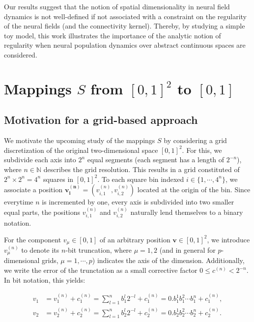 \documentclass[10pt,letterpaper]{article}
\renewcommand{\vec}[1]{\boldsymbol{#1}}
\begin{document}



Our results suggest that the notion of spatial dimensionality in neural field dynamics is not well-defined if not associated with a constraint on the regularity of the neural fields (and the connectivity kernel). Thereby, by studying a simple toy model, this work illustrates the importance of the analytic notion of regularity when neural population dynamics over abstract continuous spaces are considered. 

\section{Mappings $S$ from $[0,1]^2$ to $[0,1]$}

\subsection{Motivation for a grid-based approach}

We motivate the upcoming study of the mappings $S$ by considering a grid discretization of the original two-dimensional space $[0,1]^2$. For this, we subdivide each axis into $2^n$ equal segments (each segment has a length of $2^{-n}$), where $n \in \mathbb{N}$ describes the grid resolution. This results in a grid constituted of $2^n \times 2^n = 4^n$ squares in $[0,1]^2$. To each square bin indexed $i \in \{1,\cdots,4^n\}$, we associate a position $\vec{v_i^{(n)}} = (v_{i,1}^{(n)}, v_{i,2}^{(n)})$ located at the origin of the bin. Since everytime $n$ is incremented by one, every axis is subdivided into two smaller equal parts, the positions $v_{i,1}^{(n)}$ and $v_{i,2}^{(n)}$ naturally lend themselves to a binary notation.

For the component $v_\mu \in [0,1]$ of an arbitrary position $\vec{v} \in [0,1]^2$, we introduce $v_\mu^{(n)}$ to denote its $n$-bit truncation, where $\mu = 1,2$ (and in general for $p$-dimensional grids, $\mu=1, \cdots, p$) indicates the axis of the dimension. Additionally, we write the error of the trunctation as a small corrective factor $0 \leq c^{(n)} < 2^{-n}$. In bit notation, this yields: 

\begin{equation} \begin{aligned} \label{eq:positions-v}
v_1 &= v_1^{(n)} + c_1^{(n)} = \sum_{l=1}^n b_1^l 2^{-l} + c_1^{(n)} = 0.b_1^1 b_1^2 \cdots b_1^n + c_1^{(n)}, \\
v_2 &= v_2^{(n)} + c_2^{(n)} = \sum_{l=1}^n b_2^l 2^{-l} + c_2^{(n)} = 0.b_2^1 b_2^2 \cdots b_2^n + c_2^{(n)}.
\end{aligned}\end{equation}
\end{document}

